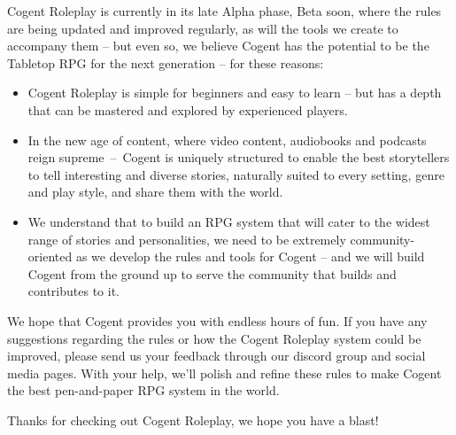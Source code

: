 Cogent Roleplay is currently in its late Alpha phase, Beta soon, where the rules are being updated and improved regularly, as will the tools we create to accompany them – but even so, we believe Cogent has the potential to be the Tabletop RPG for the next generation – for these reasons:

\begin{itemize}
    \item Cogent Roleplay is simple for beginners and easy to learn – but has a depth that can be mastered and explored by experienced players.
    \item In the new age of content, where video content, audiobooks and podcasts reign supreme~–~Cogent is uniquely structured to enable the best storytellers to tell interesting and diverse stories, naturally suited to every setting, genre and play style, and share them with the world.
    \item We understand that to build an RPG system that will cater to the widest range of stories and personalities, we need to be extremely community-oriented as we develop the rules and tools for Cogent – and we will build Cogent from the ground up to serve the community that builds and contributes to it.
\end{itemize}

We hope that Cogent provides you with endless hours of fun. If you have any suggestions regarding the rules or how the Cogent Roleplay system could be improved, please send us your feedback through our discord group and social media pages. With your help, we’ll polish and refine these rules to make Cogent the best pen-and-paper RPG system in the world.

Thanks for checking out Cogent Roleplay, we hope you have a blast!